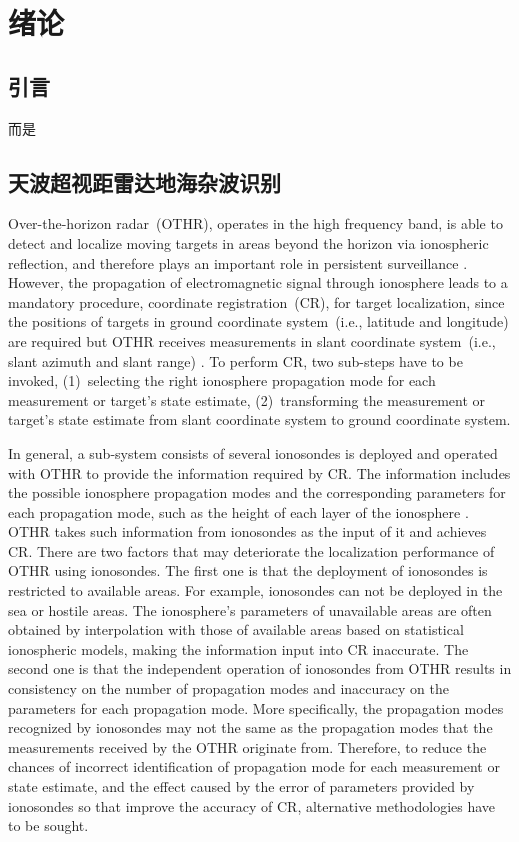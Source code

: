 \chapter{绪论}
\section{引言}
而是
\section{天波超视距雷达地海杂波识别}
Over-the-horizon radar~(OTHR), operates in the high frequency band, is able to detect and localize moving targets in areas beyond the horizon via ionospheric reflection, and therefore plays an important role in persistent surveillance \cite{headrick1974over, fabrizio2013high}. However, the propagation of electromagnetic signal through ionosphere leads to a mandatory procedure, coordinate registration~(CR), for target localization, since the positions of targets in ground coordinate system~(i.e., latitude and longitude) are required but OTHR receives measurements in slant coordinate system~(i.e., slant azimuth and slant range) \cite{krolik1997maximum}. To perform CR, two sub-steps have to be invoked, (1)~selecting the right ionosphere propagation mode for each measurement or target's state estimate, (2)~transforming the measurement or target's state estimate from slant coordinate system to ground coordinate system.

In general, a sub-system consists of several ionosondes is deployed and operated with OTHR to provide the information required by CR. The information includes the possible ionosphere propagation modes and the corresponding parameters for each propagation mode, such as the height of each layer of the ionosphere \cite{wheadon1994ionospheric}. OTHR takes such information from ionosondes as the input of it and achieves CR. There are two factors that may deteriorate the localization performance of OTHR using ionosondes. The first one is that the deployment of ionosondes is restricted to available areas. For example, ionosondes can not be deployed in the sea or hostile areas. The ionosphere's parameters of unavailable areas are often obtained by interpolation with those of available areas based on statistical ionospheric models, making the information input into CR inaccurate. The second one is that the independent operation of ionosondes from OTHR results in consistency on the number of propagation modes and inaccuracy on the parameters for each propagation mode. More specifically, the propagation modes recognized by ionosondes may not the same as the propagation modes that the measurements received by the OTHR originate from. Therefore, to reduce the chances of incorrect identification of propagation mode for each measurement or state estimate, and the effect caused by the error of parameters provided by ionosondes so that improve the accuracy of CR, alternative methodologies have to be sought.

